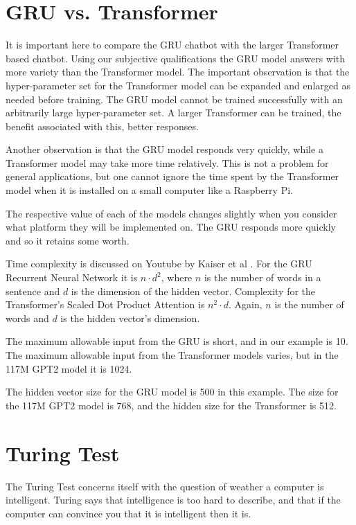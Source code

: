 

\section{GRU vs. Transformer}
It is important here to compare the GRU chatbot with the larger Transformer based chatbot. Using our subjective qualifications the GRU model answers with more variety than the Transformer model. The important observation is that the hyper-parameter set for the Transformer model can be expanded and enlarged as needed before training. The GRU model cannot be trained successfully with an arbitrarily large hyper-parameter set. A larger Transformer can be trained, the benefit associated with this, better responses.

Another observation is that the GRU model responds very quickly, while a Transformer model may take more time relatively. This is not a problem for general applications, but one cannot ignore the time spent by the Transformer model when it is installed on a small computer like a Raspberry Pi. 

The respective value of each of the models changes slightly when you consider what platform they will be implemented on. The GRU responds more quickly and so it retains some worth.

Time complexity is discussed on Youtube by Kaiser et al \cite{youtubeKaiser2017}. For the GRU Recurrent Neural Network it is $ n \cdot d^2 $, where $ n $ is the number of words in a sentence and $ d $ is the dimension of the hidden vector. Complexity for the Transformer's Scaled Dot Product Attention is $ n^2 \cdot  d $. Again, $n$ is the number of words and $d$ is the hidden vector's dimension. 

The maximum allowable input from the GRU is short, and in our example is 10. The maximum allowable input from the Transformer models varies, but in the 117M GPT2 model it is 1024. 

The hidden vector size for the GRU model is 500 in this example. The size for the 117M GPT2 model is 768, and the hidden size for the Transformer is 512.

\section{Turing Test}

The Turing Test concerns itself with the question of weather a computer is intelligent. Turing says that intelligence is too hard to describe, and that if the computer can convince you that it is intelligent then it is.

